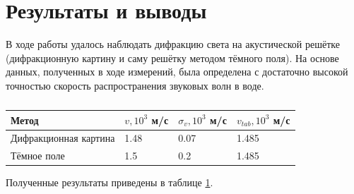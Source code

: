 \documentclass{article}
\begin{document}
\section{Результаты и выводы}
В ходе работы удалось наблюдать дифракцию света на акустической решётке (дифракционную картину и саму решётку методом тёмного поля). На основе данных, полученных в ходе измерений, была определена с достаточно высокой точностью скорость распространения звуковых волн в воде.
\begin{table}[h!]
\centering
\caption{}
\label{table4}
\begin{tabular}{|l|l|l|l|}
\hline
Метод                 & $v, 10^3$ м/с & $\sigma_v, 10^3$ м/с & $v_{tab}, 10^3$ м/с \\ \hline
Дифракционная картина & 1.48          & 0.07                 & 1.485               \\ \hline
Тёмное поле           & 1.5           & 0.2                  & 1.485               \\ \hline
\end{tabular}
\end{table}
Полученные результаты приведены в таблице \ref{table4}.
\end{document}
